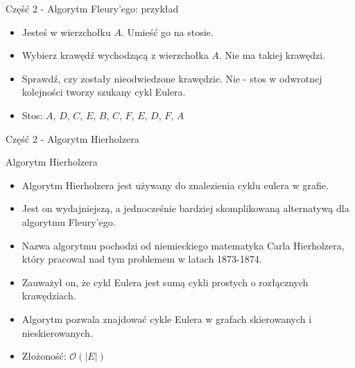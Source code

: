 \documentclass[polish,envcountsect,10pt]{beamer}
\begin{document}
\begin{frame}{Część 2 - Algorytm Fleury'ego: przykład}
    \begin{itemize}
        \item Jesteś w wierzchołku $A$. Umieść go na stosie.
        \item Wybierz krawędź wychodzącą z wierzchołka $A$. Nie ma takiej krawędzi.
        \item Sprawdź, czy zostały nieodwiedzone krawędzie. Nie - stos w odwrotnej kolejności tworzy szukany cykl Eulera.
        \item Stos: $A$, $D$, $C$, $E$, $B$, $C$, $F$, $E$, $D$, $F$, $A$
    \end{itemize}
    \begin{center}
    \end{center}
\end{frame}

\begin{frame}{Część 2 - Algorytm Hierholzera}
    \begin{block}{Algorytm Hierholzera}
        \begin{itemize}
            \item Algorytm Hierholzera jest używany do znalezienia cyklu eulera w grafie.
            \item Jest on wydajniejszą, a jednocześnie bardziej skomplikowaną alternatywą dla algorytmu Fleury'ego.
            \item Nazwa algorytmu pochodzi od niemieckiego matematyka Carla Hierholzera, który pracował nad tym problemem w latach 1873-1874.
            \item Zauważył on, że cykl Eulera jest sumą cykli prostych o rozłącznych krawędziach.
            \item Algorytm pozwala znajdować cykle Eulera w grafach skierowanych i nieskierowanych.
            \item Złożoność: $\mathcal{O}(|E|)$
        \end{itemize}
    \end{block}
\end{frame}
    
\end{document}
